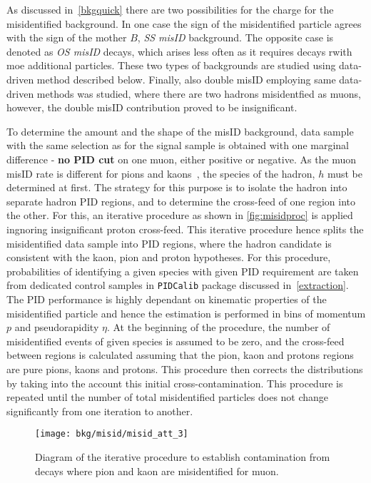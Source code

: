 As discussed in~\autoref{bkgquick} there are two possibilities for the charge for the misidentified background. In one case the sign of the misidentified particle agrees with the sign of the mother $B$, \textit{SS misID} background. The opposite case is denoted as \textit{OS misID} decays, which arises less often as it requires decays rwith moe additional particles. These two types of backgrounds are studied using data-driven method described below. Finally, also double misID employing same data-driven methods was studied, where there are two hadrons misidentfied as muons, however, the double misID contribution proved to be insignificant.


To determine the amount and the shape of the misID background, data sample with the same selection as for the signal sample is obtained with one marginal difference - \textbf{no \gls{PID} cut} on one muon, either positive or negative. As the muon misID rate is different for pions and kaons~\cite{LHCb-DP-2013-001}, the species of the hadron, $h$ must be determined at first. The strategy for this purpose is to isolate the hadron into separate hadron \gls{PID} regions, and to determine the cross-feed of one region into the other. For this, an iterative procedure as shown in \autoref{fig:misidproc} is applied ingnoring insignificant proton cross-feed. This iterative procedure hence splits the misidentified data sample into \gls{PID} regions, where the hadron candidate is consistent with the kaon, pion and proton hypotheses. For this procedure, probabilities of identifying a given species with given \gls{PID} requirement are taken from dedicated control samples in \texttt{PIDCalib} package \cite{Anderlini:2202412} discussed in~\autoref{extraction}. The \gls{PID} performance is highly dependant on kinematic properties of the misidentified particle and hence the estimation is performed in bins of momentum $p$ and pseudorapidity $\eta$.
At the beginning of the procedure, the number of misidentified events of given species is assumed to be zero, and the
cross-feed between regions is calculated assuming that the pion, kaon and protons regions are pure pions, kaons and protons.
This procedure then corrects the distributions by taking into the account this initial cross-contamination.
This procedure is repeated until the number of total misidentified particles does not change significantly from one iteration to another.

\begin{figure}[h]
  \begin{center}
    \texttt{[image: bkg/misid/misid\_att\_3]}%
    \vspace*{-0.5cm}
  \end{center}
  \caption{
    Diagram of the iterative procedure to establish contamination from decays where pion and kaon are misidentified for muon.
    }
  \label{fig:misidproc}
\end{figure}



